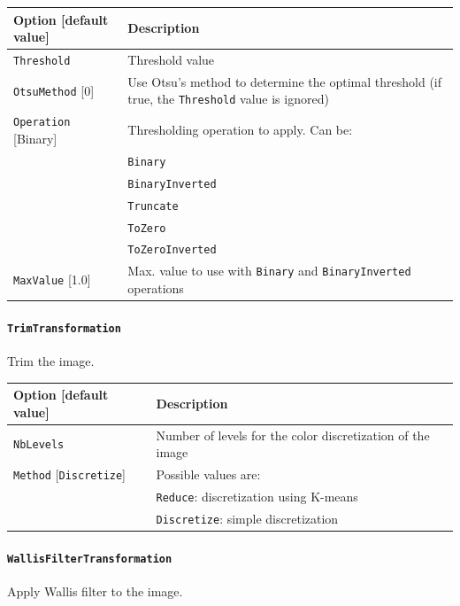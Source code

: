 \documentclass[a4paper,11pt,oneside]{article}
\newcommand{\iponly}{\reversemarginpar
    \marginnote{\color{listletiblue}\normalfont\scriptsize
    {\ttfamily{}\hyperref[sec:N2D2-IP]{\color{listletiblue}N2D2 IP}} \emph{only}}}
\begin{document}
\begin{center}
 \begin{tabular}{| p{5cm} | p{10cm} | }
 \hline
 Option [default value] & Description\\
 \hline\hline
  \cellcolor{requiredcolor}\lstinline!Threshold! & Threshold value \\
  \lstinline!OtsuMethod! [0] & Use Otsu's method to determine the optimal
  threshold (if true, the \lstinline!Threshold! value is ignored) \\
  \lstinline!Operation! [Binary] & Thresholding operation to apply. Can be:\\
   & \lstinline!Binary! \\
   & \lstinline!BinaryInverted! \\
   & \lstinline!Truncate! \\
   & \lstinline!ToZero! \\
   & \lstinline!ToZeroInverted! \\
  \lstinline!MaxValue! [1.0] & Max. value to use with \lstinline!Binary! and \lstinline!BinaryInverted! operations \\
 \hline
\end{tabular}
\end{center}


\paragraph{\texorpdfstring{%
\lstinline[basicstyle=\ttfamily\bfseries]!TrimTransformation!}
{TrimTransformation}}
Trim the image.

\begin{center}
 \begin{tabular}{| p{5cm} | p{10cm} | }
 \hline
 Option [default value] & Description\\
 \hline\hline
  \cellcolor{requiredcolor}\lstinline!NbLevels! & Number of levels for the color discretization of the image \\
  \lstinline!Method! [\lstinline!Discretize!] & Possible values are: \\
   & \lstinline!Reduce!: discretization using K-means \\
   & \lstinline!Discretize!: simple discretization \\
 \hline
\end{tabular}
\end{center}


\paragraph{\texorpdfstring{%
\lstinline[basicstyle=\ttfamily\bfseries]!WallisFilterTransformation!%
\protect\iponly}{WallisFilterTransformation}}
Apply Wallis filter to the image.
\end{document}

